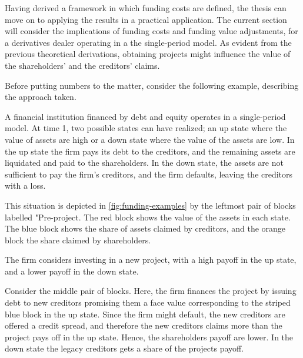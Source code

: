 \documentclass[main.tex]{subfiles}
\begin{document}
    Having derived a framework in which funding costs are defined, 
    the thesis can move on to applying the results in a practical application.
    The current section will consider the implications of funding costs and funding value adjustments,
    for a derivatives dealer operating in a the single-period model.
    As evident from the previous theoretical derivations, 
    obtaining projects might influence the value of the shareholders' and the creditors' claims.

    Before putting numbers to the matter, consider the following example,
    describing the approach taken.

    \begin{example}
    
    A financial institution financed by debt and equity operates in a single-period model.
    At time 1, two possible states can have realized;
    an up state where the value of assets are high
    or a down state where the value of the assets are low.
    In the up state the firm pays its debt to the creditors,
    and the remaining assets are liquidated and paid to the shareholders.
    In the down state, the assets are not sufficient to pay the firm's creditors, 
    and the firm defaults, leaving the creditors with a loss. 

    This situation is depicted in \cref{fig:funding-examples} 
    by the leftmost pair of blocks labelled "Pre-project. 
    The \textcolor{wtf-red}{red block} shows the value of the assets in each state.
    The \textcolor{wtf-blue}{blue block} shows the share of assets claimed by creditors,
    and the \textcolor{wtf-orange}{orange block} the share claimed by shareholders.

    The firm considers investing in a new project, with a high payoff in the up state,
    and a lower payoff in the down state.

    \newcommand{\striped}[2]{%
        \raisebox{-3pt}{%
        \tikz{%
            \draw%
                node[inner sep=0, outer sep=0] {\textcolor{#1}{#2}}%
                node[
                    fill, 
                    pattern=north east lines, 
                    pattern color=white,
                    inner sep=0, outer sep=0,
                ] {\phantom{#2}};}%
        }%
    }

    Consider the middle pair of blocks.
    Here, the firm finances the project by issuing debt to new creditors
    promising them a face value corresponding to the striped blue block in the up state.
    Since the firm might default, the new creditors are offered a credit spread,
    and therefore the new creditors claims more than the project pays off in the up state.
    Hence, the shareholders payoff are lower. 
    In the down state the legacy creditors gets a share of the projects payoff.


\end{example}
\end{document}
